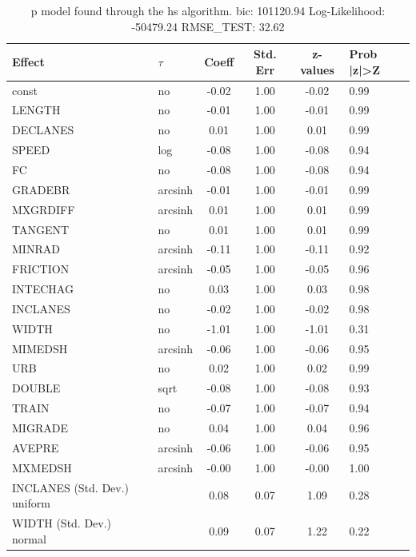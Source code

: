 \begin{table}
	\caption{p model found through the hs algorithm. bic: 101120.94 Log-Likelihood: -50479.24 RMSE_TEST: 32.62}
	\begin{center}
		\begin{tabular}{|l|l|c|c|c|l|}
			\hline
			Effect & $\tau$ & Coeff & Std. Err & z-values & Prob |z|>Z \\
			\hline
			const & no & -0.02 & 1.00 & -0.02 & 0.99 \\
			\hline
			LENGTH & no & -0.01 & 1.00 & -0.01 & 0.99 \\
			\hline
			DECLANES & no & 0.01 & 1.00 & 0.01 & 0.99 \\
			\hline
			SPEED & log & -0.08 & 1.00 & -0.08 & 0.94 \\
			\hline
			FC & no & -0.08 & 1.00 & -0.08 & 0.94 \\
			\hline
			GRADEBR & arcsinh & -0.01 & 1.00 & -0.01 & 0.99 \\
			\hline
			MXGRDIFF & arcsinh & 0.01 & 1.00 & 0.01 & 0.99 \\
			\hline
			TANGENT & no & 0.01 & 1.00 & 0.01 & 0.99 \\
			\hline
			MINRAD & arcsinh & -0.11 & 1.00 & -0.11 & 0.92 \\
			\hline
			FRICTION & arcsinh & -0.05 & 1.00 & -0.05 & 0.96 \\
			\hline
			INTECHAG & no & 0.03 & 1.00 & 0.03 & 0.98 \\
			\hline
			INCLANES & no & -0.02 & 1.00 & -0.02 & 0.98 \\
			\hline
			WIDTH & no & -1.01 & 1.00 & -1.01 & 0.31 \\
			\hline
			MIMEDSH & arcsinh & -0.06 & 1.00 & -0.06 & 0.95 \\
			\hline
			URB & no & 0.02 & 1.00 & 0.02 & 0.99 \\
			\hline
			DOUBLE & sqrt & -0.08 & 1.00 & -0.08 & 0.93 \\
			\hline
			TRAIN & no & -0.07 & 1.00 & -0.07 & 0.94 \\
			\hline
			MIGRADE & no & 0.04 & 1.00 & 0.04 & 0.96 \\
			\hline
			AVEPRE & arcsinh & -0.06 & 1.00 & -0.06 & 0.95 \\
			\hline
			MXMEDSH & arcsinh & -0.00 & 1.00 & -0.00 & 1.00 \\
			\hline
			INCLANES (Std. Dev.) uniform &  & 0.08 & 0.07 & 1.09 & 0.28 \\
			\hline
			WIDTH (Std. Dev.) normal &  & 0.09 & 0.07 & 1.22 & 0.22 \\

\end{tabular}
\end{center}
\end{table}
